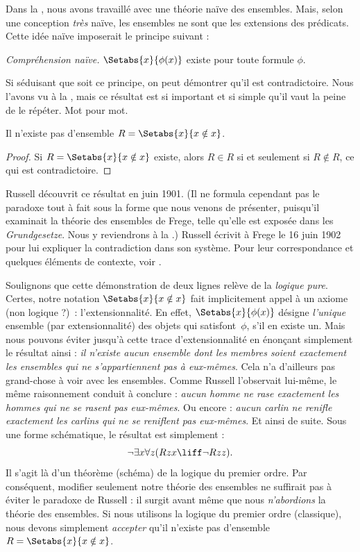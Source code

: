 \documentclass[../../../include/open-logic-section]{subfiles}
\begin{document}

Dans la , nous avons travaillé avec une théorie
naïve des ensembles. Mais, selon une conception \emph{très}
naïve, les ensembles ne sont que les extensions des prédicats. Cette
idée naïve imposerait le principe suivant :

\begin{defish}
  \emph{Compréhension naïve.} $\Setabs{x}{\phi(x)}$ existe pour toute formule $\phi$.
\end{defish}

Si séduisant que soit ce principe, on peut démontrer qu'il est
contradictoire.
Nous l'avons vu à la , mais ce résultat est
si important et si simple qu'il vaut la peine de le répéter. Mot pour
mot.

\begin{thm}
Il n'existe pas d'ensemble $R = \Setabs{x}{x \notin x}$.
\end{thm}

\begin{proof}
Si $R = \Setabs{x}{x \notin x}$ existe, alors $R \in R$ si et
seulement si $R \notin R$, ce qui est contradictoire.
\end{proof}

Russell découvrit ce résultat en juin 1901. (Il ne formula cependant
pas le paradoxe tout à fait sous la forme que nous venons de présenter,
puisqu'il examinait la théorie des ensembles de Frege, telle qu'elle
est exposée dans les \emph{Grundgesetze}. Nous y reviendrons à la
.) Russell écrivit à Frege le 16 juin 1902 pour lui
expliquer la contradiction dans son système. Pour leur correspondance
et quelques éléments de contexte, voir \citet[pp.~124--8]{Heijenoort1967}.

Soulignons que cette démonstration de deux lignes relève de la
\emph{logique pure}. Certes, notre notation $\Setabs{x}{x \notin x}$
fait implicitement appel à un axiome (non logique ?)\ :
l'extensionnalité. En effet, $\Setabs{x}{\phi(x)}$ désigne
\emph{l'unique} ensemble (par extensionnalité) des objets qui
satisfont~$\phi$, s'il en existe un. Mais nous pouvons éviter jusqu'à
cette trace d'extensionnalité en énonçant simplement le résultat ainsi :
\emph{il n'existe aucun ensemble dont les membres soient exactement
les ensembles qui ne s'appartiennent pas à eux-mêmes}. Cela n'a
d'ailleurs pas grand-chose à voir avec les ensembles. Comme Russell
l'observait lui-même, le même raisonnement conduit à conclure :
\emph{aucun homme ne rase exactement les hommes qui ne se rasent pas
eux-mêmes}. Ou encore : \emph{aucun carlin ne renifle exactement les
carlins qui ne se reniflent pas eux-mêmes}. Et ainsi de suite. Sous
une forme schématique, le résultat est simplement :
\[
\lnot \exists x \forall z(Rzx \liff \lnot R zz).
\]
Il s'agit là d'un théorème (schéma) de la logique du premier ordre.
Par conséquent, modifier seulement notre théorie des ensembles ne
suffirait pas à éviter le paradoxe de Russell : il surgit avant même
que nous \emph{n'abordions} la théorie des ensembles. Si nous
utilisons la logique du premier ordre (classique), nous devons
simplement \emph{accepter} qu'il n'existe pas d'ensemble
$R = \Setabs{x}{x\notin x}$.
\end{document}
